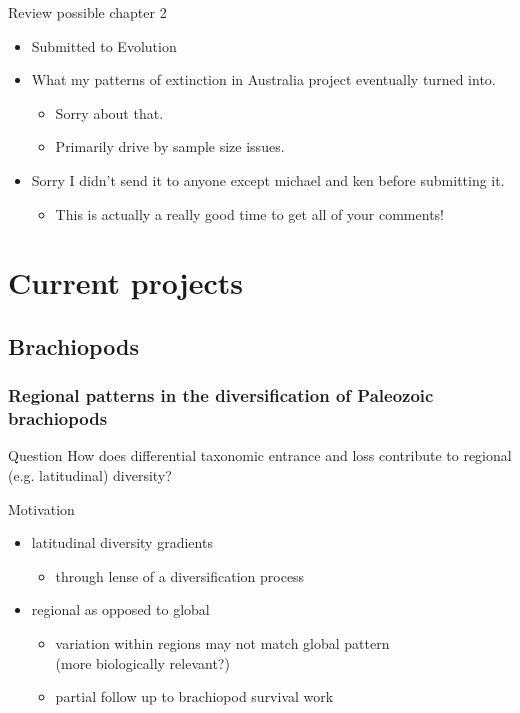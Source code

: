 \documentclass{beamer}
\begin{document}
\begin{frame}
  \begin{block}{Review possible chapter 2}
    \begin{itemize}
      \item Submitted to Evolution
      \item What my patterns of extinction in Australia project eventually turned into.
        \begin{itemize}
          \item Sorry about that.
          \item Primarily drive by sample size issues.
        \end{itemize}
      \item Sorry I didn't send it to anyone except michael and ken before submitting it.
        \begin{itemize}
          \item This is actually a really good time to get all of your comments!
        \end{itemize}
    \end{itemize}
  \end{block}
\end{frame}


\section{Current projects}
\subsection{Brachiopods}
\begin{frame}
  \frametitle{Regional patterns in the diversification of Paleozoic brachiopods}
  \begin{alertblock}{Question}
    How does differential taxonomic entrance and loss contribute to regional (e.g. latitudinal) diversity?
  \end{alertblock}
\end{frame}

\begin{frame}
  \begin{block}{Motivation}
    \begin{itemize}
      \item latitudinal diversity gradients
        \begin{itemize}
          \item through lense of a diversification process
        \end{itemize}
      \item regional as opposed to global
        \begin{itemize}
          \item variation within regions may not match global pattern \\(more biologically relevant?)
          \item partial follow up to brachiopod survival work
        \end{itemize}
    \end{itemize}
  \end{block}
\end{frame}
\end{document}
